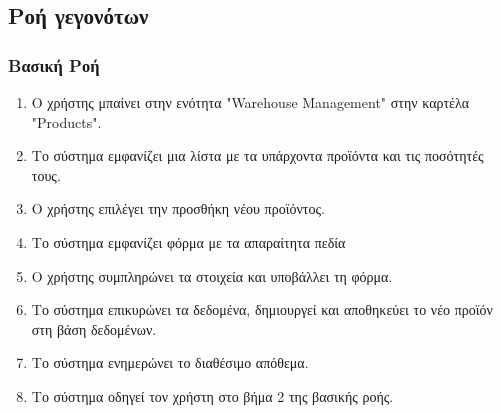 \documentclass[12pt,a4paper,twoside]{book}
\begin{document}
\subsection{Ροή γεγονότων}

\subsubsection{Βασική Ροή}
\begin{enumerate}
  \item Ο χρήστης μπαίνει στην ενότητα "Warehouse Management" στην καρτέλα "Products".
  \item Το σύστημα εμφανίζει μια λίστα με τα υπάρχοντα προϊόντα και τις ποσότητές τους.
  \item Ο χρήστης επιλέγει την προσθήκη νέου προϊόντος.
  \item Το σύστημα εμφανίζει φόρμα με τα απαραίτητα πεδία %
  \item Ο χρήστης συμπληρώνει τα στοιχεία και υποβάλλει τη φόρμα.
  \item Το σύστημα επικυρώνει τα δεδομένα, δημιουργεί και αποθηκεύει το νέο προϊόν στη βάση δεδομένων.
  \item Το σύστημα ενημερώνει το διαθέσιμο απόθεμα.
  \item Το σύστημα οδηγεί τον χρήστη στο βήμα 2 της βασικής ροής.
\end{enumerate}
\end{document}
